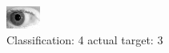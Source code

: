 \begin{figure}[h!]
\begin{center}
\includegraphics[width=0.60\columnwidth]{figures/ID273_class_4_target_3.png}
\end{center}
\caption{ Classification: 4 actual target: 3}
\label{fig:ID273_class_4_target_3}
\end{figure}
